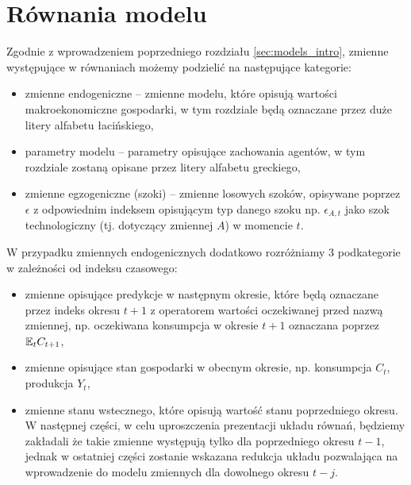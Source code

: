         \resizebox{\columnwidth}{!}{%

        }


\section{Równania modelu}

Zgodnie z wprowadzeniem poprzedniego rozdziału \ref{sec:models_intro}, zmienne występujące w równaniach możemy podzielić na następujące kategorie:
\begin{itemize}
    \item zmienne endogeniczne -- zmienne modelu, które opisują wartości makroekonomiczne gospodarki, w tym rozdziale będą oznaczane przez duże litery alfabetu łacińskiego,
    \item parametry modelu -- parametry opisujące zachowania agentów, w tym rozdziale zostaną opisane przez litery alfabetu greckiego,
    \item zmienne egzogeniczne (szoki) -- zmienne losowych szoków, opisywane poprzez $\epsilon$ z odpowiednim indeksem opisującym typ danego szoku np. $\epsilon_{A,t}$ jako szok technologiczny (tj. dotyczący zmiennej $A$) w momencie $t$.
\end{itemize}
W przypadku zmiennych endogenicznych dodatkowo rozróżniamy 3 podkategorie w zależności od indeksu czasowego:
\begin{itemize}
    \item zmienne opisujące predykcje w następnym okresie, które będą oznaczane przez indeks okresu $t+1$ z operatorem wartości oczekiwanej przed nazwą zmiennej, np. oczekiwana konsumpcja w okresie $t+1$ oznaczana poprzez $\mathbb{E}_t C_{t+1}$,
    \item zmienne opisujące stan gospodarki w obecnym okresie, np. konsumpcja $C_t$, produkcja $Y_t$,
    \item zmienne stanu wstecznego, które opisują wartość stanu poprzedniego okresu. W następnej części, w celu uproszczenia prezentacji układu równań, będziemy zakładali że takie zmienne występują tylko dla poprzedniego okresu $t-1$, jednak w ostatniej części zostanie wskazana redukcja układu pozwalająca na wprowadzenie do modelu zmiennych dla dowolnego okresu $t-j$.
\end{itemize}
